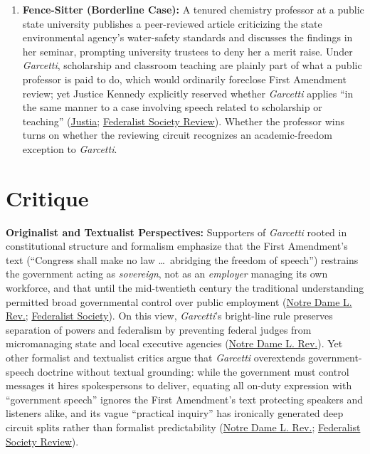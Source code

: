 \documentclass[12pt]{article}
\begin{document}
\begin{enumerate}
  \item \textbf{Fence-Sitter (Borderline Case):} A tenured chemistry professor at a public state university publishes a peer-reviewed article criticizing the state environmental agency's water-safety standards and discusses the findings in her seminar, prompting university trustees to deny her a merit raise. Under \textit{Garcetti}, scholarship and classroom teaching are plainly part of what a public professor is paid to do, which would ordinarily foreclose First Amendment review; yet Justice Kennedy explicitly reserved whether \textit{Garcetti} applies ``in the same manner to a case involving speech related to scholarship or teaching'' (\href{https://supreme.justia.com/cases/federal/us/547/410/}{Justia}; \href{https://fedsoc.org/fedsoc-review/an-academic-freedom-exception-to-government-control-of-employee-speech}{Federalist Society Review}). Whether the professor wins turns on whether the reviewing circuit recognizes an academic-freedom exception to \textit{Garcetti}.
\end{enumerate}

\section{Critique}

\textbf{Originalist and Textualist Perspectives:} Supporters of \textit{Garcetti} rooted in constitutional structure and formalism emphasize that the First Amendment's text (``Congress shall make no law \ldots\ abridging the freedom of speech'') restrains the government acting as \textit{sovereign}, not as an \textit{employer} managing its own workforce, and that until the mid-twentieth century the traditional understanding permitted broad governmental control over public employment (\href{https://scholarship.law.nd.edu/context/ndlr/article/1016/viewcontent/21_87NotreDameLRev841_2011_2012_.pdf}{Notre Dame L. Rev.}; \href{https://fedsoc.org/case/garcetti-v-ceballos}{Federalist Society}). On this view, \textit{Garcetti}'s bright-line rule preserves separation of powers and federalism by preventing federal judges from micromanaging state and local executive agencies (\href{https://scholarship.law.nd.edu/context/ndlr/article/1016/viewcontent/21_87NotreDameLRev841_2011_2012_.pdf}{Notre Dame L. Rev.}). Yet other formalist and textualist critics argue that \textit{Garcetti} overextends government-speech doctrine without textual grounding: while the government must control messages it hires spokespersons to deliver, equating all on-duty expression with ``government speech'' ignores the First Amendment's text protecting speakers and listeners alike, and its vague ``practical inquiry'' has ironically generated deep circuit splits rather than formalist predictability (\href{https://scholarship.law.nd.edu/context/ndlr/article/1016/viewcontent/21_87NotreDameLRev841_2011_2012_.pdf}{Notre Dame L. Rev.}; \href{https://fedsoc.org/fedsoc-review/an-academic-freedom-exception-to-government-control-of-employee-speech}{Federalist Society Review}).
\end{document}
